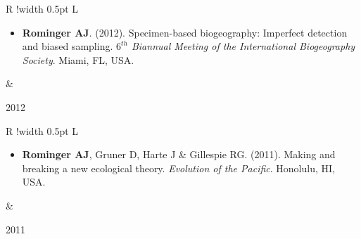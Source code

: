 \documentclass[10pt]{article}
\newcommand\VRule{\color{lightgray}\vrule width 0.5pt}
\newcommand{\cventry}[2]{%
\begin{tabular}[t]{R !{\VRule} L}
  \begin{minipage}[t][][t]{0.81\textwidth}
    #2
  \end{minipage}
  &
  \parbox[t][][t]{0.19\textwidth}{#1}
\end{tabular}%
\vspace{0.25em}
}
\begin{document}
%
\cventry{2012}{
  \begin{itemize} %
  \item[]\hspace{-1.2\leftmargin} {\bf Rominger
      AJ}. (2012). Specimen-based biogeography: Imperfect detection
    and biased sampling. {\it $6^{th}$ Biannual Meeting of the
      International Biogeography Society}. Miami, FL, USA.
\end{itemize}
}
%
\cventry{2011}{
  \begin{itemize} %
  \item[]\hspace{-1.2\leftmargin} {\bf Rominger AJ}, Gruner D, Harte J
    \& Gillespie RG. (2011). Making and breaking a new ecological
    theory. {\it Evolution of the Pacific}. Honolulu, HI, USA.
\end{itemize}
}
\end{document}
